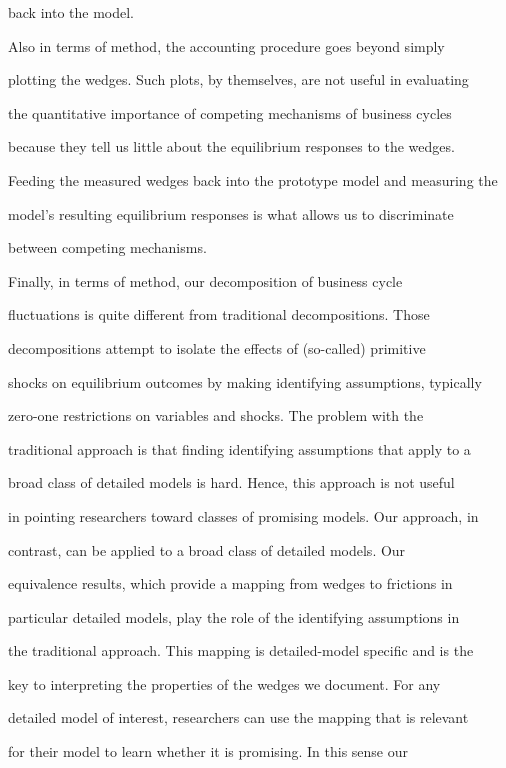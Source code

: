 \documentclass[fleqn,leqno,11pt]{article}
\begin{document}
back into the model.



Also in terms of method, the accounting procedure goes beyond simply

plotting the wedges. Such plots, by themselves, are not useful in evaluating

the quantitative importance of competing mechanisms of business cycles

because they tell us little about the equilibrium responses to the wedges.

Feeding the measured wedges back into the prototype model and measuring the

model's resulting equilibrium responses is what allows us to discriminate

between competing mechanisms.



Finally, in terms of method, our decomposition of business cycle

fluctuations is quite different from traditional decompositions. Those

decompositions attempt to isolate the effects of (so-called) primitive

shocks on equilibrium outcomes by making identifying assumptions, typically

zero-one restrictions on variables and shocks. The problem with the

traditional approach is that finding identifying assumptions that apply to a

broad class of detailed models is hard. Hence, this approach is not useful

in pointing researchers toward classes of promising models. Our approach, in

contrast, can be applied to a broad class of detailed models. Our

equivalence results, which provide a mapping from wedges to frictions in

particular detailed models, play the role of the identifying assumptions in

the traditional approach. This mapping is detailed-model specific and is the

key to interpreting the properties of the wedges we document. For any

detailed model of interest, researchers can use the mapping that is relevant

for their model to learn whether it is promising. In this sense our
\end{document}
